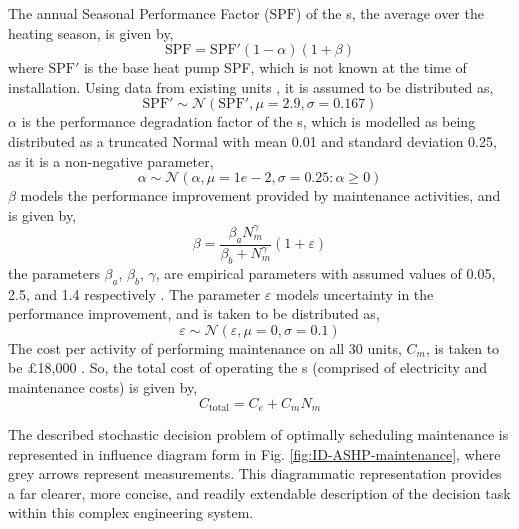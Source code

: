 \noindent
The annual Seasonal Performance Factor ($\text{SPF}$) of the s, the average  over the heating season, is given by,
\begin{equation}
    \text{SPF} = \text{SPF}'(1-\alpha)(1+\beta)
\end{equation}
where $\text{SPF}'$ is the base heat pump SPF, which is not known at the time of installation. Using data from existing  units \citep{nouvel2015EuropeanMappingSeasonal}, it is assumed to be distributed as,
\begin{equation}
    \text{SPF}' \sim \mathcal{N}\left( \text{SPF}', \mu=2.9, \sigma=0.167 \right)
\end{equation}
$\alpha$ is the performance degradation factor of the s, which is modelled as being distributed as a truncated Normal with mean 0.01 and standard deviation 0.25, as it is a non-negative parameter,
\begin{equation}
    \alpha \sim \mathcal{N}(\alpha, \mu=1e{-}2,\sigma=0.25 : \alpha \geq 0)
\end{equation}
$\beta$ models the performance improvement provided by maintenance activities, and is given by,
\begin{equation}
    \beta = \frac{\beta_a N_m^\gamma}{\beta_b + N_m^\gamma} (1+\varepsilon)
\end{equation}
the parameters $\beta_a$, $\beta_b$, $\gamma$, are empirical parameters with assumed values of 0.05, 2.5, and 1.4 respectively \citep{griffith2008MethodologyModelingBuilding}. The parameter $\varepsilon$ models uncertainty in the performance improvement, and is taken to be distributed as,
\begin{equation}
    \varepsilon \sim \mathcal{N}(\varepsilon, \mu=0,\sigma=0.1)
\end{equation}
The cost per activity of performing maintenance on all 30  units, $C_m$, is taken to be £18,000 \citep{daikin2022DaikinUKPrice}. So, the total cost of operating the s (comprised of electricity and maintenance costs) is given by,
\begin{equation} \label{eq:ASHP-total-cost}
    C_{\text{total}} = C_e + C_m N_m
\end{equation}

The described stochastic decision problem of optimally scheduling  maintenance is represented in influence diagram form in Fig. \ref{fig:ID-ASHP-maintenance}, where grey arrows represent measurements. This diagrammatic representation provides a far clearer, more concise, and readily extendable description of the decision task within this complex engineering system.\\

